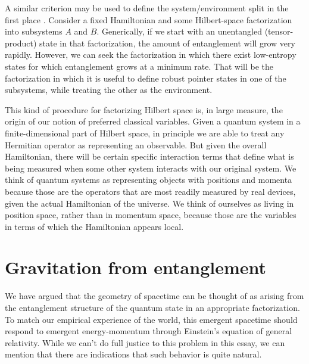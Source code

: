 \documentclass[12pt,english]{article}
\begin{document}
A similar criterion may be used to define the system/environment split in the first place \cite{Tegmark:2014kka,mereology}.
Consider a fixed Hamiltonian and some Hilbert-space factorization into subsystems $A$ and $B$. 
Generically, if we start with an unentangled (tensor-product) state in that factorization, the amount of entanglement will grow very rapidly.
However, we can seek the factorization in which there exist low-entropy states for which entanglement grows at a minimum rate.
That will be the factorization in which it is useful to define robust pointer states in one of the subsystems, while treating the other as the environment.

This kind of procedure for factorizing Hilbert space is, in large measure, the origin of our notion of preferred classical variables.
Given a quantum system in a finite-dimensional part of Hilbert space, in principle we are able to treat any Hermitian operator as representing an observable.
But given the overall Hamiltonian, there will be certain specific interaction terms that define what is being measured when some other system interacts with our original system.
We think of quantum systems as representing objects with positions and momenta because those are the operators that are most readily measured by real devices, given the actual Hamiltonian of the universe.
We think of ourselves as living in position space, rather than in momentum space, because those are the variables in terms of which the Hamiltonian appears local.


\section {Gravitation from entanglement}

We have argued that the geometry of spacetime can be thought of as arising from the entanglement structure of the quantum state in an appropriate factorization.
To match our empirical experience of the world, this emergent spacetime should respond to emergent energy-momentum through Einstein's equation of general relativity.
While we can't do full justice to this problem in this essay, we can mention that there are indications that such behavior is quite natural.
\end{document}
